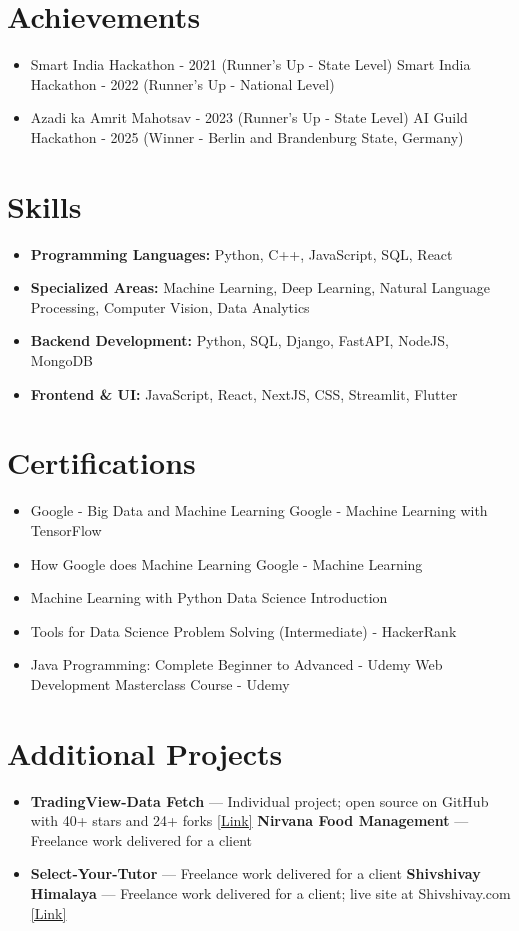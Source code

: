 \documentclass[a4paper,10pt]{article}
\begin{document}
\section*{Achievements}
\begin{itemize}
\item Smart India Hackathon - 2021 (Runner's Up - State Level) \hfill Smart India Hackathon - 2022 (Runner's Up - National Level)
\item Azadi ka Amrit Mahotsav - 2023 (Runner's Up - State Level) \hfill AI Guild Hackathon - 2025 (Winner - Berlin and Brandenburg State, Germany)
\end{itemize}

\section*{Skills}
\begin{itemize}
  \item \textbf{Programming Languages:} Python, C++, JavaScript, SQL, React
  \item \textbf{Specialized Areas:} Machine Learning, Deep Learning, Natural Language Processing, Computer Vision, Data Analytics
  \item \textbf{Backend Development:} Python, SQL, Django, FastAPI, NodeJS, MongoDB
  \item \textbf{Frontend \& UI:} JavaScript, React, NextJS, CSS, Streamlit, Flutter
\end{itemize}

\section*{Certifications}
\begin{itemize}
\item Google - Big Data and Machine Learning \hfill Google - Machine Learning with TensorFlow
\item How Google does Machine Learning \hfill Google - Machine Learning
\item Machine Learning with Python \hfill Data Science Introduction
\item Tools for Data Science \hfill Problem Solving (Intermediate) - HackerRank
\item Java Programming: Complete Beginner to Advanced - Udemy \hfill Web Development Masterclass Course - Udemy
\end{itemize}

\section*{Additional Projects}
\begin{itemize}
\item \textbf{TradingView-Data Fetch} — Individual project; open source on GitHub with 40+ stars and 24+ forks \href{https://github.com/ravalmeet/TradingView}{[Link]} \hfill \textbf{Nirvana Food Management} — Freelance work delivered for a client
\item \textbf{Select-Your-Tutor} — Freelance work delivered for a client \hfill \textbf{Shivshivay Himalaya} — Freelance work delivered for a client; live site at Shivshivay.com \href{Shivshivay.com}{[Link]}
\end{itemize}
\end{document}
